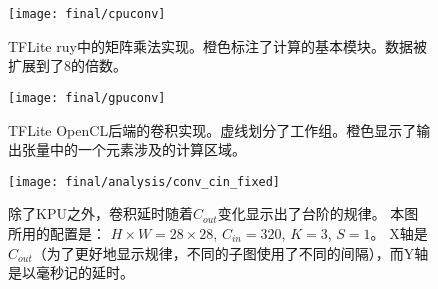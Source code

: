 \begin{figure}
    \centering
    \texttt{[image: final/cpuconv]}
    \caption{TFLite ruy中的矩阵乘法实现。橙色标注了计算的基本模块。数据被扩展到了8的倍数。}
    \label{fig:cpuconv}
\end{figure}

\begin{figure}
    \centering
    \texttt{[image: final/gpuconv]}
    \caption{TFLite OpenCL后端的卷积实现。虚线划分了工作组。橙色显示了输出张量中的一个元素涉及的计算区域。}
    \label{fig:gpuconv}
\end{figure}

\begin{figure}
	\centering
	\texttt{[image: final/analysis/conv\_cin\_fixed]}
	\caption{
        除了KPU之外，卷积延时随着$C_{out}$变化显示出了台阶的规律。
        本图所用的配置是：
        $H \times W=28 \times 28$, $C_{in}=320$, $K=3$, $S=1$。
        X轴是$C_{out}$（为了更好地显示规律，不同的子图使用了不同的间隔），而Y轴是以毫秒记的延时。
	}
	\label{fig:conv_cin_fixed}
	\label{conv_latency}
\end{figure}